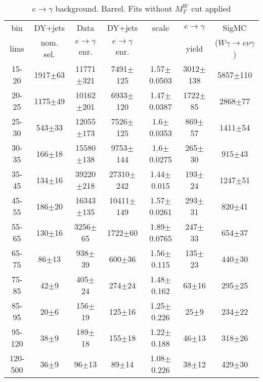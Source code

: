 \begin{table}[h]
  \scriptsize
  \begin{center}
  \caption{$e\rightarrow\gamma$ background. Barrel. Fits without $M_T^W$ cut applied } 
   \begin{tabular}{|c|c|c|c|c|c|c|}
 bin  & DY+jets    & Data                      & DY+jets & scale & $e\rightarrow\gamma$ & SigMC\\ 
 lims & nom. sel. & $e\rightarrow\gamma$ enr. & $e\rightarrow\gamma$ enr. & & yield & ($W\gamma\rightarrow e\nu\gamma$)\\ \hline
15-20 & 1917$\pm$63 & 11771$\pm$321 & 7491$\pm$125 & 1.57$\pm$0.0503& 3012$\pm$138& 5857$\pm$110 \\ \hline
20-25 & 1175$\pm$49 & 10162$\pm$201 & 6933$\pm$120 & 1.47$\pm$0.0387& 1722$\pm$85& 2868$\pm$77 \\ \hline
25-30 & 543$\pm$33 & 12055$\pm$173 & 7526$\pm$125 & 1.6$\pm$0.0353& 869$\pm$57& 1411$\pm$54 \\ \hline
30-35 & 166$\pm$18 & 15580$\pm$138 & 9753$\pm$144 & 1.6$\pm$0.0275& 265$\pm$30& 915$\pm$43 \\ \hline
35-45 & 134$\pm$16 & 39220$\pm$218 & 27310$\pm$242 & 1.44$\pm$0.015& 193$\pm$24& 1247$\pm$51 \\ \hline
45-55 & 186$\pm$20 & 16343$\pm$135 & 10411$\pm$149 & 1.57$\pm$0.0261& 293$\pm$31& 820$\pm$41 \\ \hline
55-65 & 130$\pm$16 & 3256$\pm$65 & 1722$\pm$60 & 1.89$\pm$0.0765& 247$\pm$33& 654$\pm$37 \\ \hline
65-75 & 86$\pm$13 & 938$\pm$39 & 600$\pm$36 & 1.56$\pm$0.115& 135$\pm$23& 440$\pm$30 \\ \hline
75-85 & 42$\pm$9 & 405$\pm$24 & 274$\pm$24 & 1.48$\pm$0.162& 63$\pm$16& 295$\pm$25 \\ \hline
85-95 & 20$\pm$6 & 156$\pm$19 & 125$\pm$16 & 1.25$\pm$0.226& 25$\pm$9& 234$\pm$22 \\ \hline
95-120 & 38$\pm$9 & 189$\pm$18 & 155$\pm$18 & 1.22$\pm$0.188& 46$\pm$13& 318$\pm$26 \\ \hline
120-500 & 36$\pm$9 & 96$\pm$13 & 89$\pm$14 & 1.08$\pm$0.226& 38$\pm$12& 429$\pm$30 \\ \hline
  \end{tabular}
  \label{tab:EtoGAMMA_NoWMtCut_0}
  \end{center}
\end{table}

